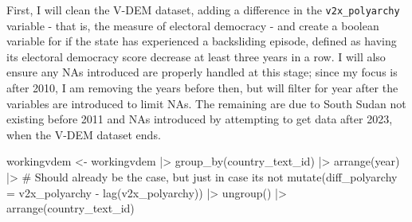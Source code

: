 \documentclass[
  letterpaper,
  DIV=11,
  numbers=noendperiod]{scrartcl}
\newenvironment{Shaded}{\begin{snugshade}}{\end{snugshade}}
\newcommand{\AttributeTok}[1]{\textcolor[rgb]{0.40,0.45,0.13}{#1}}
\newcommand{\CommentTok}[1]{\textcolor[rgb]{0.37,0.37,0.37}{#1}}
\newcommand{\FunctionTok}[1]{\textcolor[rgb]{0.28,0.35,0.67}{#1}}
\newcommand{\NormalTok}[1]{\textcolor[rgb]{0.00,0.23,0.31}{#1}}
\newcommand{\OtherTok}[1]{\textcolor[rgb]{0.00,0.23,0.31}{#1}}
\newcommand{\SpecialCharTok}[1]{\textcolor[rgb]{0.37,0.37,0.37}{#1}}
\begin{document}
First, I will clean the V-DEM dataset, adding a difference in the
\texttt{v2x\_polyarchy} variable - that is, the measure of electoral
democracy - and create a boolean variable for if the state has
experienced a backsliding episode, defined as having its electoral
democracy score decrease at least three years in a row. I will also
ensure any NAs introduced are properly handled at this stage; since my
focus is after 2010, I am removing the years before then, but will
filter for year after the variables are introduced to limit NAs. The
remaining are due to South Sudan not existing before 2011 and NAs
introduced by attempting to get data after 2023, when the V-DEM dataset
ends.

\begin{Shaded}
\begin{Highlighting}[]
\NormalTok{workingvdem }\OtherTok{\textless{}{-}}\NormalTok{ workingvdem }\SpecialCharTok{|\textgreater{}}
  \FunctionTok{group\_by}\NormalTok{(country\_text\_id) }\SpecialCharTok{|\textgreater{}}
  \FunctionTok{arrange}\NormalTok{(year) }\SpecialCharTok{|\textgreater{}} \CommentTok{\# Should already be the case, but just in case it\textquotesingle{}s not}
  \FunctionTok{mutate}\NormalTok{(}\AttributeTok{diff\_polyarchy =}\NormalTok{ v2x\_polyarchy }\SpecialCharTok{{-}} \FunctionTok{lag}\NormalTok{(v2x\_polyarchy)) }\SpecialCharTok{|\textgreater{}}
  \FunctionTok{ungroup}\NormalTok{() }\SpecialCharTok{|\textgreater{}}
  \FunctionTok{arrange}\NormalTok{(country\_text\_id)}


\end{Highlighting}
\end{Shaded}
\end{document}
